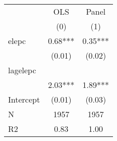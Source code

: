 \begin{table}
\caption{}
\begin{center}
\begin{tabular}{lcc}
\hline
          &   OLS   &  Panel   \\
          &   (0)   &   (1)    \\
\midrule
\midrule
elepc     & 0.68*** & 0.35***  \\
          & (0.01)  & (0.02)   \\
lagelepc  &         &          \\
          & 2.03*** & 1.89***  \\
Intercept & (0.01)  & (0.03)   \\
N         & 1957    & 1957     \\
R2        & 0.83    & 1.00     \\
\hline
\end{tabular}
\end{center}
\end{table}
